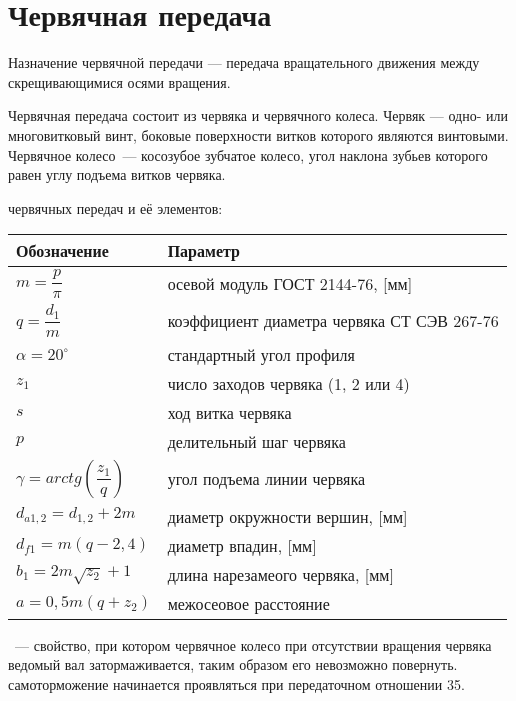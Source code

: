 \chapter{Червячная передача}
\label{ch:chervak}

Назначение червячной передачи --- передача вращательного движения между скрещивающимися осями вращения.

Червячная передача состоит из червяка и червячного колеса. Червяк --- одно- или многовитковый винт, боковые поверхности витков которого являются винтовыми. Червячное колесо~--- косозубое зубчатое колесо, угол наклона зубьев которого равен углу подъема витков червяка.

 червячных передач и её элементов:
\begin{table}[ht]
	\centering
	\selectfont
	\begin{tabular}{ll}
		\toprule
		Обозначение & Параметр \\ 
		\midrule
		$ m = \dfrac{p}{\pi}$ & осевой модуль ГОСТ 2144-76, [мм] \\
		$ q= \dfrac{d_1}{m} $ & коэффициент диаметра червяка СТ СЭВ 267-76 \\
		$ \alpha = 20^\circ $ & стандартный угол профиля \\
		$ z_1 $ & число заходов червяка (1, 2 или 4) \\
		$ s $ & ход витка червяка \\
		$ p $ & делительный шаг червяка \\
		$ \gamma = arctg(\dfrac{z_1}{q}) $ & угол подъема линии червяка \\
		$ d_{a1,2} = d_{1,2} + 2m $ & диаметр окружности вершин, [мм] \\
		$ d_{f1} = m(q-2,4) $ & диаметр впадин, [мм] \\
		$ b_1 = 2m\sqrt{z_2} + 1 $ & длина нарезамеого червяка, [мм] \\
		$ a = 0,5m(q+z_2) $ & межосеовое расстояние\\
		\bottomrule
	\end{tabular}
	\label{tab:parChervak}
\end{table}

~--- свойство, при котором червячное колесо при отсутствии вращения червяка ведомый вал затормаживается, таким образом его невозможно повернуть. самоторможение начинается проявляться при передаточном отношении 35. 

